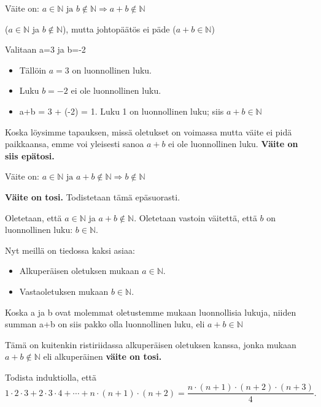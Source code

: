 \documentclass[12pt,a4paper]{article}
\newcommand{\N}{\mathbb{N}}
\begin{document}
  \begin{alakohta}
  \item %
    Väite on: $a\in\N \textrm{ ja } b\notin\N \Rightarrow a+b\notin\N$

    ($a\in\N$ ja $b\notin\N$), mutta johtopäätös ei päde ($a+b\in\N$)

    Valitaan a=3 ja b=-2
    \begin{itemize}
      \item Tällöin $a=3$ on luonnollinen luku.
      \item Luku $b=-2$ ei ole luonnollinen luku.
      \item a+b = 3 + (-2) = 1. Luku 1 on luonnollinen luku; siis $a+b\in\N$
    \end{itemize}
    Koska löysimme tapauksen, missä oletukset on voimassa mutta väite
    ei pidä paikkaansa, emme voi yleisesti sanoa $a+b$ ei ole
    luonnollinen luku. \textbf{Väite on siis epätosi.} 

  \item %
    Väite on: $a\in\N \textrm{ ja } a+b\notin\N \Rightarrow b\notin\N$

    \textbf{Väite on tosi.} Todistetaan tämä epäsuorasti.

    Oletetaan, että $a\in\N$ ja $a+b\notin\N$. Oletetaan vastoin väitettä,
    että $b$ on luonnollinen luku: $b\in\N$.

    Nyt meillä on tiedossa kaksi asiaa:
    \begin{itemize}
      \item Alkuperäisen oletuksen mukaan $a\in\N$.
      \item Vastaoletuksen mukaan $b\in\N$.
    \end{itemize}
    Koska a ja b ovat molemmat
    oletustemme mukaan luonnollisia lukuja, niiden summan a+b on siis
    pakko olla luonnollinen luku, eli $a+b\in\N$

    Tämä on kuitenkin ristiriidassa alkuperäisen oletuksen kanssa,
    jonka mukaan $a+b\notin\N$ eli alkuperäinen \textbf{väite on tosi.} 
\end{alakohta}






\pagebreak
{}
Todista induktiolla, että
\[
1\cdot 2 \cdot 3 + 2\cdot 3\cdot 4 + \cdots + n\cdot (n+1) \cdot (n+2) = \frac{n\cdot(n+1)\cdot(n+2)\cdot(n+3)}{4}.
\]
\end{document}
